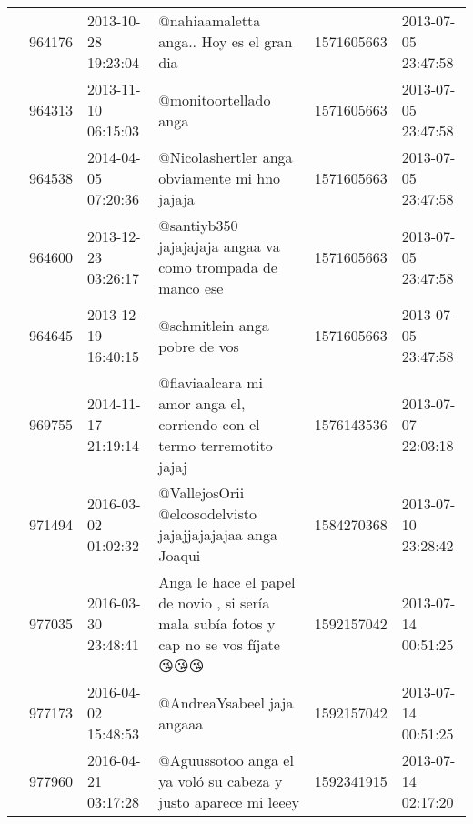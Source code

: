 \begin{tabular}{llllrl}
           & 964176  & 2013-10-28 19:23:04 &                                                                                                     @nahiaamaletta anga.. Hoy es el gran dia &  1571605663 & 2013-07-05 23:47:58 \\
           & 964313  & 2013-11-10 06:15:03 &                                                                                                                        @monitoortellado anga &  1571605663 & 2013-07-05 23:47:58 \\
           & 964538  & 2014-04-05 07:20:36 &                                                                                                @Nicolashertler anga obviamente mi hno jajaja &  1571605663 & 2013-07-05 23:47:58 \\
           & 964600  & 2013-12-23 03:26:17 &                                                                                   @santiyb350 jajajajaja angaa va como trompada de manco ese &  1571605663 & 2013-07-05 23:47:58 \\
           & 964645  & 2013-12-19 16:40:15 &                                                                                                                @schmitlein anga pobre de vos &  1571605663 & 2013-07-05 23:47:58 \\
           & 969755  & 2014-11-17 21:19:14 &                                                                      @flaviaalcara mi amor anga el, corriendo con el termo terremotito jajaj &  1576143536 & 2013-07-07 22:03:18 \\
           & 971494  & 2016-03-02 01:02:32 &                                                                                     @VallejosOrii @elcosodelvisto jajajjajajajaa anga Joaqui &  1584270368 & 2013-07-10 23:28:42 \\
           & 977035  & 2016-03-30 23:48:41 &                                                        Anga le hace el papel de novio , si sería mala subía fotos y cap no se vos fíjate 😘😘😘 &  1592157042 & 2013-07-14 00:51:25 \\
           & 977173  & 2016-04-02 15:48:53 &                                                                                                                   @AndreaYsabeel jaja angaaa &  1592157042 & 2013-07-14 00:51:25 \\
           & 977960  & 2016-04-21 03:17:28 &                                                                            @Aguussotoo  anga el ya voló su  cabeza y justo  aparece mi leeey &  1592341915 & 2013-07-14 02:17:20 \\

\end{tabular}
